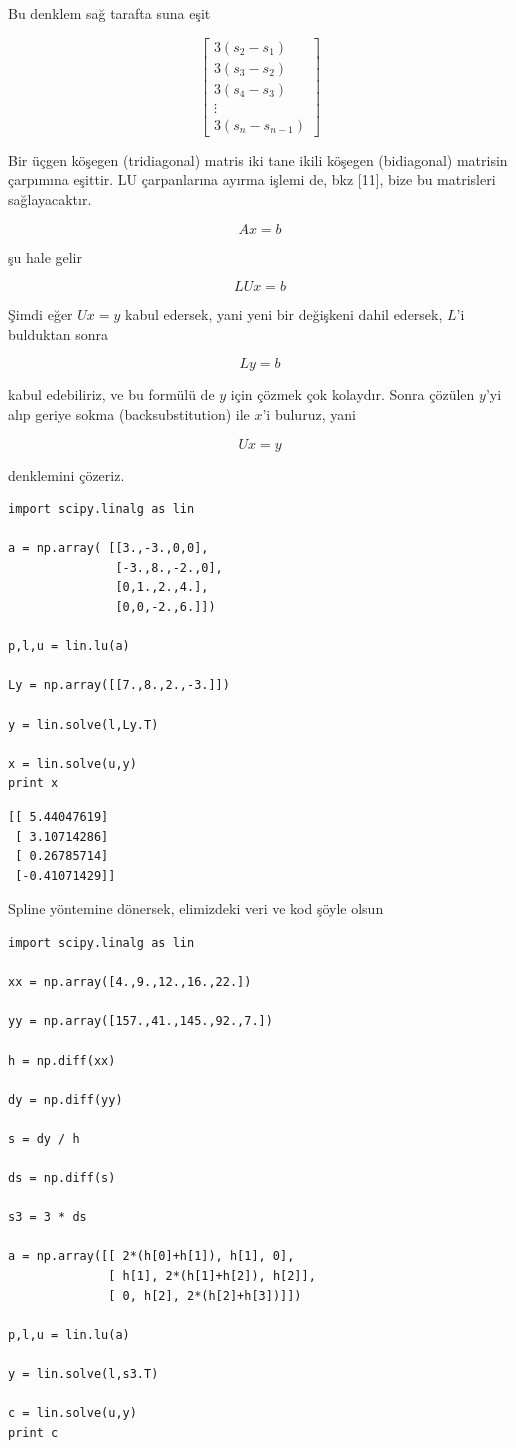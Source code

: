 \documentclass[12pt,fleqn]{article}\usepackage{../../common}
\begin{document}
Bu denklem sağ tarafta suna eşit 

$$ 
\left[\begin{array}{r}
3(s_2 - s_1) \\
3(s_3 - s_2) \\
3(s_4 - s_3) \\
\vdots \\
3(s_n - s_{n-1}) 
\end{array}\right]
 $$

 Bir üçgen köşegen (tridiagonal) matris iki tane ikili köşegen (bidiagonal)
 matrisin çarpımına eşittir. LU çarpanlarına ayırma işlemi de, bkz [11], bize
 bu matrisleri sağlayacaktır.

$$ Ax = b $$

şu hale gelir

$$ LUx = b $$

Şimdi eğer $Ux = y$ kabul edersek, yani yeni bir değişkeni dahil edersek,
$L$'i bulduktan sonra

$$ Ly = b $$

kabul edebiliriz, ve bu formülü de $y$ için çözmek çok kolaydır. Sonra
çözülen $y$'yi alıp geriye sokma (backsubstitution) ile $x$'i buluruz, yani 

$$ Ux = y $$ 

denklemini çözeriz. 

\begin{verbatim}
import scipy.linalg as lin

a = np.array( [[3.,-3.,0,0],
               [-3.,8.,-2.,0],
               [0,1.,2.,4.],
               [0,0,-2.,6.]])

p,l,u = lin.lu(a)

Ly = np.array([[7.,8.,2.,-3.]])

y = lin.solve(l,Ly.T)

x = lin.solve(u,y)
print x
\end{verbatim}

\begin{verbatim}
[[ 5.44047619]
 [ 3.10714286]
 [ 0.26785714]
 [-0.41071429]]
\end{verbatim}

Spline yöntemine dönersek, elimizdeki veri ve kod şöyle olsun

\begin{verbatim}
import scipy.linalg as lin

xx = np.array([4.,9.,12.,16.,22.])

yy = np.array([157.,41.,145.,92.,7.])

h = np.diff(xx)

dy = np.diff(yy)

s = dy / h

ds = np.diff(s)

s3 = 3 * ds

a = np.array([[ 2*(h[0]+h[1]), h[1], 0],
              [ h[1], 2*(h[1]+h[2]), h[2]],
              [ 0, h[2], 2*(h[2]+h[3])]])

p,l,u = lin.lu(a)

y = lin.solve(l,s3.T)

c = lin.solve(u,y)
print c
\end{verbatim}
\end{document}
